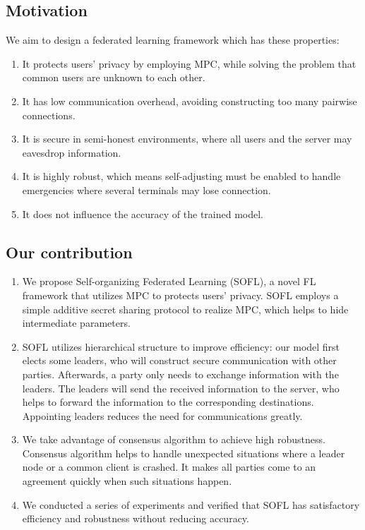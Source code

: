 \subsection{Motivation} We aim to design a federated learning framework which has these properties:
\begin{enumerate}
    \item It protects users' privacy by employing MPC, while solving the problem that common users are unknown to each other.

    \item It has low communication overhead, avoiding constructing too many pairwise connections.

    \item It is secure in semi-honest environments, where all users and the server may eavesdrop information.

    \item It is highly robust, which means self-adjusting must be enabled to handle emergencies where several terminals may lose connection.

    \item It does not influence the accuracy of the trained model.
\end{enumerate}

\subsection{Our contribution}
\begin{enumerate}
    \item We propose Self-organizing Federated Learning (SOFL), a novel FL framework that utilizes MPC to protects users' privacy. SOFL employs a simple additive secret sharing protocol to realize MPC, which helps to hide intermediate parameters.

    \item SOFL utilizes hierarchical structure to improve efficiency: our model first elects some leaders, who will construct secure communication with other parties. Afterwards, a party only needs to exchange information with the leaders. The leaders will send the received information to the server, who helps to forward the information to the corresponding destinations. Appointing leaders reduces the need for communications greatly.

    \item We take advantage of consensus algorithm to achieve high robustness. Consensus algorithm helps to handle unexpected situations where a leader node or a common client is crashed. It makes all parties come to an agreement quickly when such situations happen.

    \item We conducted a series of experiments and verified that SOFL has satisfactory efficiency and robustness without reducing accuracy.

\end{enumerate}

